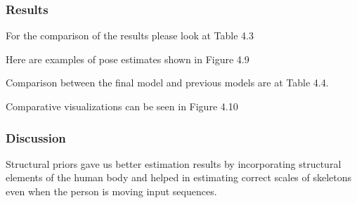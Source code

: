 \subsubsection{Results}

For the comparison of the results please look at Table 4.3

Here are examples of pose estimates shown in Figure 4.9

Comparison between the final model and previous models are at Table 4.4.

Comparative visualizations can be seen in Figure 4.10

\subsubsection{Discussion}

Structural priors gave us better estimation results by incorporating structural elements of the human body and helped in estimating correct scales of skeletons even when the person is moving input sequences.
